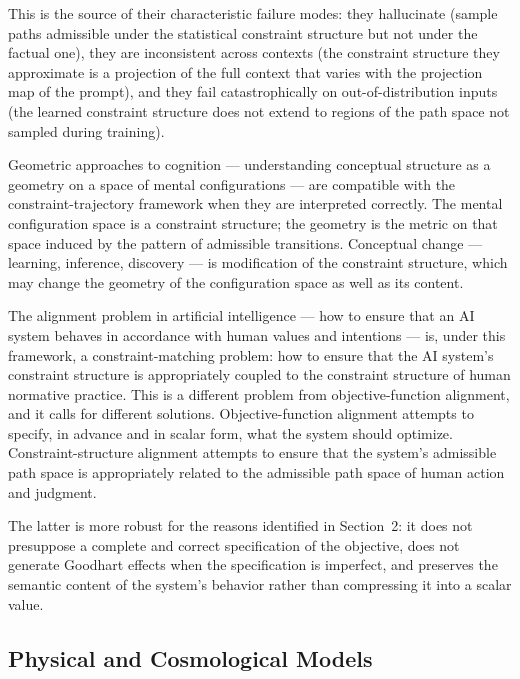\documentclass[12pt, twoside]{article}
\theoremstyle{plain}
\theoremstyle{definition}
\theoremstyle{remark}
\begin{document}
This is the source of their characteristic failure modes:
they hallucinate (sample paths admissible under the statistical
constraint structure but not under the factual one),
they are inconsistent across contexts (the constraint structure
they approximate is a projection of the full context that varies
with the projection map of the prompt),
and they fail catastrophically on out-of-distribution inputs
(the learned constraint structure does not extend to regions of
the path space not sampled during training).

Geometric approaches to cognition — understanding conceptual
structure as a geometry on a space of mental configurations —
are compatible with the constraint-trajectory framework when
they are interpreted correctly.
The mental configuration space is a constraint structure;
the geometry is the metric on that space induced by the
pattern of admissible transitions.
Conceptual change — learning, inference, discovery — is modification
of the constraint structure, which may change the geometry
of the configuration space as well as its content.

The alignment problem in artificial intelligence — how to ensure that
an AI system behaves in accordance with human values and intentions —
is, under this framework, a constraint-matching problem:
how to ensure that the AI system's constraint structure is appropriately
coupled to the constraint structure of human normative practice.
This is a different problem from objective-function alignment,
and it calls for different solutions.
Objective-function alignment attempts to specify, in advance and in
scalar form, what the system should optimize.
Constraint-structure alignment attempts to ensure that the system's
admissible path space is appropriately related to the admissible
path space of human action and judgment.

The latter is more robust for the reasons identified in Section~2:
it does not presuppose a complete and correct specification of
the objective, does not generate Goodhart effects when the
specification is imperfect, and preserves the semantic content
of the system's behavior rather than compressing it into a scalar value.

\subsection{Physical and Cosmological Models}
\end{document}
